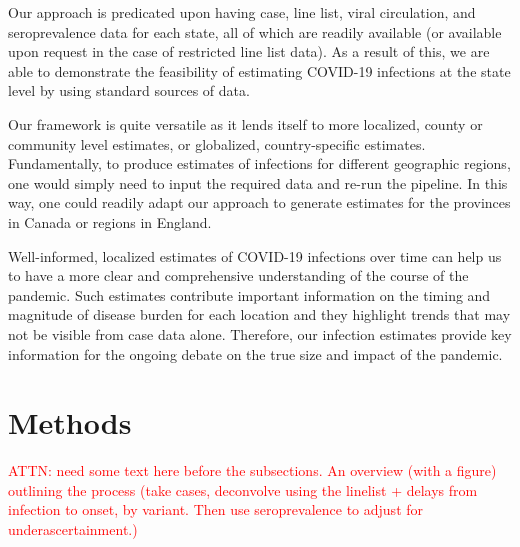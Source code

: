 \documentclass{article}
\newcommand{\attn}[1]{\textcolor{red}{ATTN: #1}}
\begin{document}
Our approach is predicated upon having case, line list, viral circulation, and seroprevalence data for each state, all of which are readily available (or available upon request in the case of restricted line list data). As a result of this, we are able to demonstrate the feasibility of estimating COVID-19 infections at the state level by using standard sources of data. 

Our framework is quite versatile as it lends itself to more localized, county or community level estimates, or globalized, country-specific estimates. Fundamentally, to produce estimates of infections for different geographic regions, one would simply need to input the required data and re-run the pipeline. In this way, one could readily adapt our approach to generate estimates for the provinces in Canada or regions in England.

Well-informed, localized estimates of COVID-19 infections over time can help us to have a more clear and comprehensive understanding of the course of the pandemic. Such estimates contribute important information on the timing and magnitude of disease burden for each location and they highlight trends that may not be visible from case data alone. Therefore, our infection estimates provide key information for the ongoing debate on the true size and impact of the pandemic.

\section{Methods}

\attn{need some text here before the subsections. An overview (with a figure) outlining the process (take cases, deconvolve using the linelist + delays from infection to onset, by variant. Then use seroprevalence to adjust for underascertainment.)}
\end{document}
